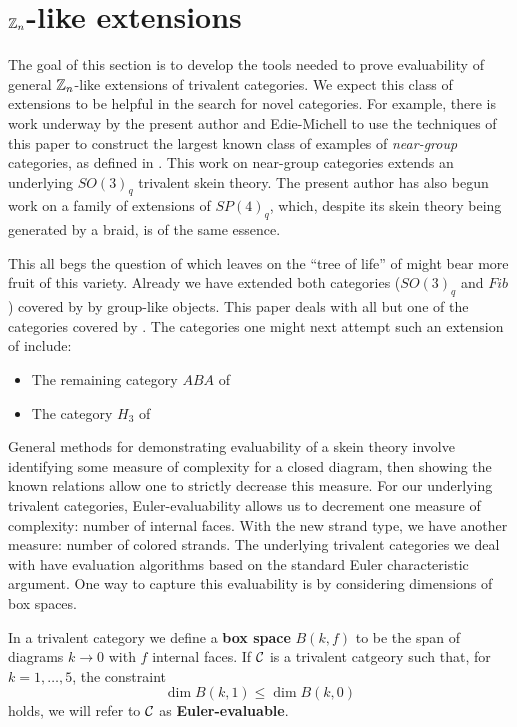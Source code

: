 \section{$\mathbb{Z}_n$-like extensions}\label{sec:skein}

The goal of this section is to develop the tools needed to prove evaluability of general $\mathbb{Z}_n$-like extensions of trivalent categories.
We expect this class of extensions to be helpful in the search for novel categories.
For example, there is work underway by the present author and Edie-Michell to use the techniques of this paper to 
construct the largest known class of examples of {\it near-group} categories, as defined in \cite{gannon_near-groups}.
This work on near-group categories extends an underlying $SO(3)_q$ trivalent skein theory.
The present author has also begun work on a family of extensions of $SP(4)_q$, which, despite its skein theory being
generated by a braid, is of the same essence. 


This all begs the question of which leaves on the ``tree of life'' of \cite{tricats} 
might bear more fruit of this variety.
Already we have extended both categories ($SO(3)_q$ and $Fib$) covered by \cite[Theorem A]{tricats} by group-like objects.
This paper deals with all but one of the categories covered by \cite[Theorem B]{tricats}.
The categories one might next attempt such an extension of include:
\begin{itemize}
    \item The remaining category $ABA$ of \cite[Theorem B]{tricats}
    \item The category $H_3$ of \cite[Theorem C]{tricats}
\end{itemize}

General methods for demonstrating evaluability of a skein theory involve identifying some measure of complexity for a closed diagram, then showing the known relations allow one to strictly decrease this measure. 
For our underlying trivalent categories, Euler-evaluability allows us to decrement one measure of complexity: number of internal faces. 
With the new strand type, we have another measure: number of colored strands. 
The underlying trivalent categories we deal with have evaluation algorithms based on the standard Euler characteristic argument.
One way to capture this evaluability is by considering dimensions of box spaces.
\begin{definition}
    In a trivalent category we define a {\bf box space} $B(k,f)$ to be the span of diagrams $k\to0$ with $f$ internal faces.
    If $\mathcal{C}$ is a trivalent catgeory such that, for $k=1,\dots,5$, the constraint
    \[
    \dim B(k,1) \leq \dim B(k,0)
    \]
    holds, we will refer to $\mathcal{C}$ as {\bf Euler-evaluable}.
\end{definition}




